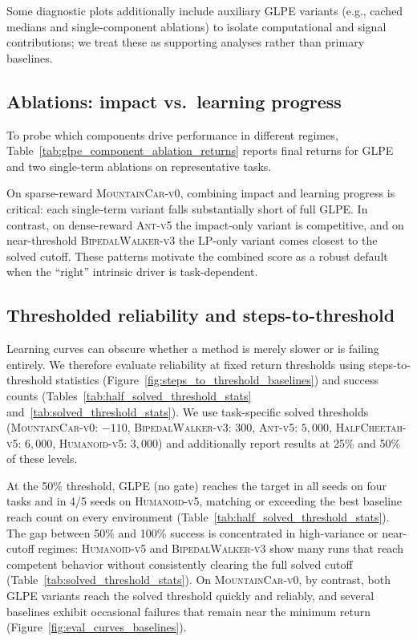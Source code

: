 Some diagnostic plots additionally include auxiliary GLPE variants (e.g., cached medians and single-component ablations) to isolate computational and signal contributions; we treat these as supporting analyses rather than primary baselines.





\subsection{Ablations: impact vs.\ learning progress}

To probe which components drive performance in different regimes, Table~\ref{tab:glpe_component_ablation_returns} reports final returns for GLPE and two single-term ablations on representative tasks.

On sparse-reward \textsc{MountainCar-v0}, combining impact and learning progress is critical: each single-term variant falls substantially short of full GLPE.
In contrast, on dense-reward \textsc{Ant-v5} the impact-only variant is competitive, and on near-threshold \textsc{BipedalWalker-v3} the LP-only variant comes closest to the solved cutoff.
These patterns motivate the combined score as a robust default when the ``right'' intrinsic driver is task-dependent.



\subsection{Thresholded reliability and steps-to-threshold}

Learning curves can obscure whether a method is merely slower or is failing entirely.
We therefore evaluate reliability at fixed return thresholds using steps-to-threshold statistics (Figure~\ref{fig:steps_to_threshold_baselines}) and success counts (Tables~\ref{tab:half_solved_threshold_stats} and~\ref{tab:solved_threshold_stats}).
We use task-specific solved thresholds (\textsc{MountainCar-v0}: $-110$, \textsc{BipedalWalker-v3}: $300$, \textsc{Ant-v5}: $5{,}000$, \textsc{HalfCheetah-v5}: $6{,}000$, \textsc{Humanoid-v5}: $3{,}000$) and additionally report results at 25\% and 50\% of these levels.

At the 50\% threshold, GLPE (no gate) reaches the target in all seeds on four tasks and in 4/5 seeds on \textsc{Humanoid-v5}, matching or exceeding the best baseline reach count on every environment (Table~\ref{tab:half_solved_threshold_stats}).
The gap between 50\% and 100\% success is concentrated in high-variance or near-cutoff regimes: \textsc{Humanoid-v5} and \textsc{BipedalWalker-v3} show many runs that reach competent behavior without consistently clearing the full solved cutoff (Table~\ref{tab:solved_threshold_stats}).
On \textsc{MountainCar-v0}, by contrast, both GLPE variants reach the solved threshold quickly and reliably, and several baselines exhibit occasional failures that remain near the minimum return (Figure~\ref{fig:eval_curves_baselines}).

